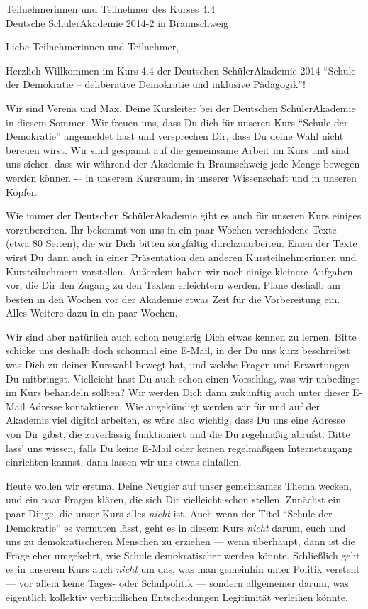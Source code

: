 \documentclass[a4paper]{letter}
\date{15.\ April 2014}
\begin{document}
\begin{letter}{
	Teilnehmerinnen und Teilnehmer des Kurses 4.4 \\
	Deutsche SchülerAkademie 2014-2 in Braunschweig}

\opening{Liebe Teilnehmerinnen und Teilnehmer,}

Herzlich Willkommen im Kurs 4.4 der Deutschen SchülerAkademie 2014 ``Schule der Demokratie -- deliberative Demokratie und inklusive Pädagogik''!

Wir sind Verena und Max, Deine Kursleiter bei der Deutschen SchülerAkademie in diesem Sommer.
Wir freuen uns, dass Du dich für unseren Kurs ``Schule der Demokratie'' angemeldet hast und versprechen Dir, dass Du deine Wahl nicht bereuen wirst.
Wir sind gespannt auf die gemeinsame Arbeit im Kurs und sind uns sicher, dass wir während der Akademie in Braunschweig jede Menge bewegen werden können -– in unserem Kursraum, in unserer Wissenschaft und in unseren Köpfen.

Wie immer der Deutschen SchülerAkademie gibt es auch für unseren Kurs einiges vorzubereiten.
Ihr bekommt von uns in ein paar Wochen verschiedene Texte (etwa 80 Seiten), die wir Dich bitten sorgfältig durchzuarbeiten.
Einen der Texte wirst Du dann auch in einer Präsentation den anderen Kursteilnehmerinnen und Kursteilnehmern vorstellen.
Außerdem haben wir noch einige kleinere Aufgaben vor, die Dir den Zugang zu den Texten erleichtern werden.
Plane deshalb am besten in den Wochen vor der Akademie etwas Zeit für die Vorbereitung ein.
Alles Weitere dazu in ein paar Wochen.

Wir sind aber natürlich auch schon neugierig Dich etwas kennen zu lernen.
Bitte schicke uns deshalb doch schonmal eine E-Mail, in der Du uns kurz beschreibst was Dich zu deiner Kurswahl bewegt hat, und welche Fragen und Erwartungen Du mitbringst.
Vielleicht hast Du auch schon einen Vorschlag, was wir unbedingt im Kurs behandeln sollten?
Wir werden Dich dann zukünftig auch unter dieser E-Mail Adresse kontaktieren.
Wie angekündigt werden wir für und auf der Akademie viel digital arbeiten, es wäre also wichtig, dass Du uns eine Adresse von Dir gibst, die zuverlässig funktioniert und die Du regelmäßig abrufst.
Bitte lass' uns wissen, falls Du keine E-Mail oder keinen regelmäßigen Internetzugang einrichten kannst, dann lassen wir uns etwas einfallen.

Heute wollen wir erstmal Deine Neugier auf unser gemeinsames Thema wecken, und ein paar Fragen klären, die sich Dir vielleicht schon stellen.
Zunächst ein paar Dinge, die unser Kurs alles \emph{nicht} ist.
Auch wenn der Titel ``Schule der Demokratie'' es vermuten lässt, geht es in diesem Kurs \emph{nicht} darum, euch und uns zu demokratischeren Menschen zu erziehen --- wenn überhaupt, dann ist die Frage eher umgekehrt, wie Schule demokratischer werden könnte.
Schließlich geht es in unserem Kurs auch \emph{nicht} um das, was man gemeinhin unter Politik versteht --- vor allem keine Tages- oder Schulpolitik --- sondern allgemeiner darum, was eigentlich kollektiv verbindlichen Entscheidungen Legitimität verleihen könnte.


\end{letter}
\end{document}
